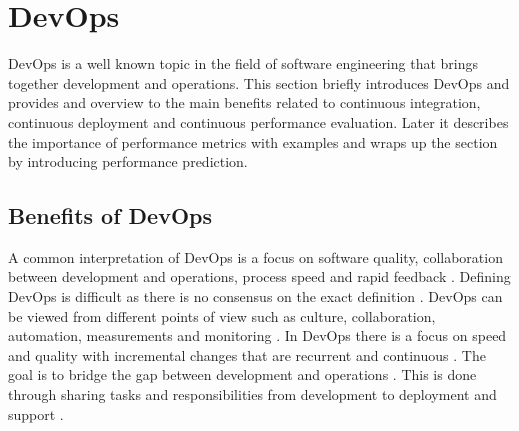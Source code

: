 
\section{DevOps} %
\label{sec:devops}

DevOps is a well known topic in the field of software engineering that brings together development and operations. This section briefly introduces DevOps and provides and overview to the main benefits related to continuous integration, continuous deployment and continuous performance evaluation. Later it describes the importance of performance metrics with examples and wraps up the section by introducing performance prediction.

\subsection{Benefits of DevOps}

A common  interpretation of DevOps is a focus on software quality, collaboration between development and operations, process speed and rapid feedback \parencite{mishraDevOpsSoftwareQuality2020,wallerIncludingPerformanceBenchmarks2015, pereraImproveSoftwareQuality2017}. Defining DevOps is difficult as there is no consensus on the exact definition \parencite{smedsDevOpsDefinitionPerceived2015,mishraDevOpsSoftwareQuality2020}. DevOps can be viewed from different points of view such as culture, collaboration, automation, measurements and monitoring \parencite{mishraDevOpsSoftwareQuality2020, wallerIncludingPerformanceBenchmarks2015}. In DevOps there is a focus on speed and quality with incremental changes that are recurrent and continuous \parencite{mishraDevOpsSoftwareQuality2020}. The goal is to bridge the gap between development and operations \parencite{smedsDevOpsDefinitionPerceived2015}. This is done through sharing tasks and responsibilities from development to deployment and support \parencite{mishraDevOpsSoftwareQuality2020}.


